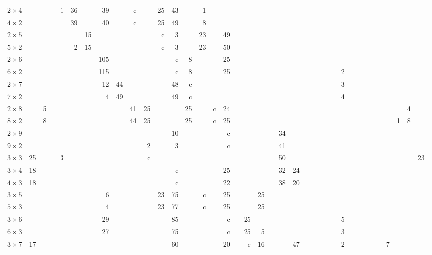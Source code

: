 \begin{table}
\begin{tabular}{l
rrrrrrrrrrrrrrrrrrrrrrrrrrrrrrrrrrrrr}
$2\times4$& & & &1&36& &39& &c& &25&43& &1& & & & & & & & & & & & & & & & & & & & & & & \\
$4\times2$& & & & &39& &40& &c& &25&49& &8& & & & & & & & & & & & & & & & & & & & & & & \\
$2\times5$& & & & & &15& & & & &c&3& &23& &49& & & & & & & & & & & & & & & & & & & & & \\
$5\times2$& & & & &2&15& & & & &c&3& &23& &50& & & & & & & & & & & & & & & & & & & & & \\
$2\times6$& & & & & & &105& & & & &c&8& & &25& & & & & & & & & & & & & & & & & & & & & \\
$6\times2$& & & & & & &115& & & & &c&8& & &25& & & & & & & & & & & &2& & & & & & & & & \\
$2\times7$& & & & & & &12&44& & & &48&c& & & & & & & & & & & & & & &3& & & & & & & & & \\
$7\times2$& & & & & & &4&49& & & &49&c& & & & & & & & & & & & & & &4& & & & & & & & & \\
$2\times8$& &5& & & & & & &41&25& & &25& &c&24& & & & & & & & & & & & & & & & & & & &4& \\
$8\times2$& &8& & & & & & &44&25& & &25& &c&25& & & & & & & & & & & & & & & & & & &1&8& \\
$2\times9$& & & & & & & & & & & &10& & & &c& & & & &34& & & & & & & & & & & & & & & & \\
$9\times2$& & & & & & & & & &2& &3& & & &c& & & & &41& & & & & & & & & & & & & & & & \\
$3\times3$&25& & &3& & & & & &c& & & & & & & & & & &50& & & & & & & & & & & & & & & &23\\
$3\times4$&18& & & & & & & & & & &c& & & &25& & & & &32&24& & & & & & & & & & & & & & & \\
$4\times3$&18& & & & & & & & & & &c& & & &22& & & & &38&20& & & & & & & & & & & & & & & \\
$3\times5$& & & & & & &6& & & &23&75& &c& &25& & &25& & & & & & & & & & & & & & & & & & \\
$5\times3$& & & & & & &4& & & &23&77& &c& &25& & &25& & & & & & & & & & & & & & & & & & \\
$3\times6$& & & & & & &29& & & & &85& & & &c& &25& & & & & & & & & &5& & & & & & & & & \\
$6\times3$& & & & & & &27& & & & &75& & & &c& &25&5& & & & & & & & &3& & & & & & & & & \\
$3\times7$&17& & & & & & & & & & &60& & & &20& &c&16& & &47& & & & & &2& & & & & &7& & & \\

\end{tabular}
\end{table}
